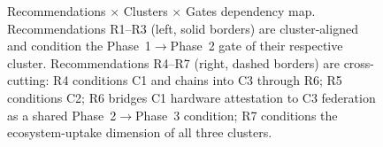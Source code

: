 \documentclass[10pt]{article}
\begin{document}
\begin{figure}[p]
\begin{tikzpicture}
\end{tikzpicture}
\caption{Recommendations $\times$ Clusters $\times$ Gates dependency map. Recommendations R1--R3 (left, solid borders) are cluster-aligned and condition the Phase~1$\rightarrow$Phase~2 gate of their respective cluster. Recommendations R4--R7 (right, dashed borders) are cross-cutting: R4 conditions C1 and chains into C3 through R6; R5 conditions C2; R6 bridges C1 hardware attestation to C3 federation as a shared Phase~2$\rightarrow$Phase~3 condition; R7 conditions the ecosystem-uptake dimension of all three clusters.}
\label{fig:rec-map}
\end{figure}
\end{document}
